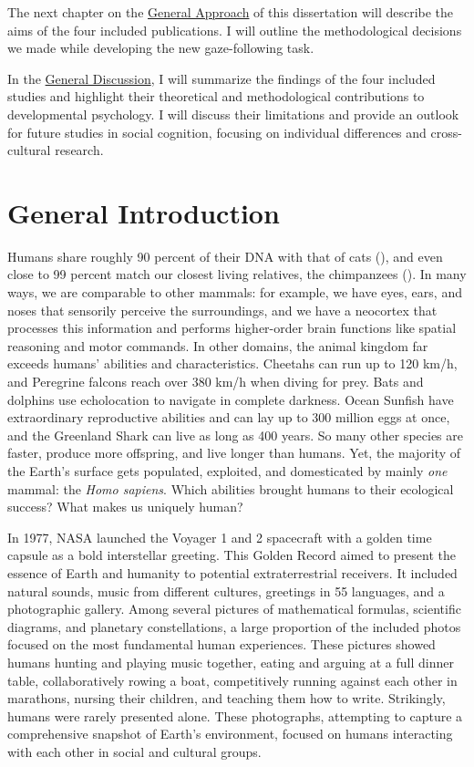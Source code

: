 \documentclass[
]{scrbook}
\begin{document}
The next chapter on the \hyperref[approach]{General Approach} of this dissertation will describe the aims of the four included publications. I will outline the methodological decisions we made while developing the new gaze-following task.

In the \hyperref[discussion]{General Discussion}, I will summarize the findings of the four included studies and highlight their theoretical and methodological contributions to developmental psychology. I will discuss their limitations and provide an outlook for future studies in social cognition, focusing on individual differences and cross-cultural research.

\mainmatter

\chapter{General Introduction}\label{introduction}

Humans share roughly 90 percent of their DNA with that of cats (), and even close to 99 percent match our closest living relatives, the chimpanzees (). In many ways, we are comparable to other mammals: for example, we have eyes, ears, and noses that sensorily perceive the surroundings, and we have a neocortex that processes this information and performs higher-order brain functions like spatial reasoning and motor commands. In other domains, the animal kingdom far exceeds humans' abilities and characteristics. Cheetahs can run up to 120 km/h, and Peregrine falcons reach over 380 km/h when diving for prey. Bats and dolphins use echolocation to navigate in complete darkness. Ocean Sunfish have extraordinary reproductive abilities and can lay up to 300 million eggs at once, and the Greenland Shark can live as long as 400 years. So many other species are faster, produce more offspring, and live longer than humans. Yet, the majority of the Earth's surface gets populated, exploited, and domesticated by mainly \emph{one} mammal: the \emph{Homo sapiens}. Which abilities brought humans to their ecological success? What makes us uniquely human?

In 1977, NASA launched the Voyager 1 and 2 spacecraft with a golden time capsule as a bold interstellar greeting. This Golden Record aimed to present the essence of Earth and humanity to potential extraterrestrial receivers. It included natural sounds, music from different cultures, greetings in 55 languages, and a photographic gallery. Among several pictures of mathematical formulas, scientific diagrams, and planetary constellations, a large proportion of the included photos focused on the most fundamental human experiences. These pictures showed humans hunting and playing music together, eating and arguing at a full dinner table, collaboratively rowing a boat, competitively running against each other in marathons, nursing their children, and teaching them how to write. Strikingly, humans were rarely presented alone. These photographs, attempting to capture a comprehensive snapshot of Earth's environment, focused on humans interacting with each other in social and cultural groups.
\end{document}
